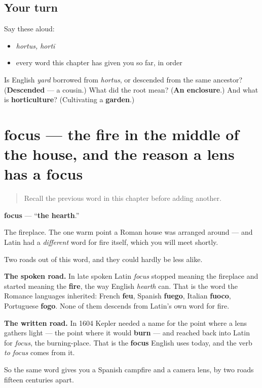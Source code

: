 \subsection*{Your turn}
Say these aloud:

\begin{itemize}
\raggedright
  \item \emph{hortus, hortī}
  \item every word this chapter has given you so far, in order
\end{itemize}

\begin{tcolorbox}[breakable,colback=teal!4,colframe=teal!35!black,title={Before you move on}]
Is English \emph{yard} borrowed from \emph{hortus}, or descended from the same ancestor? (\textbf{Descended} — a cousin.) What did the root mean? (\textbf{An enclosure}.) And what is \textbf{horticulture}? (Cultivating a \textbf{garden}.)
\end{tcolorbox}
\section[focus, focī]{focus — the fire in the middle of the house, and the reason a lens has a focus}

\label{lesson:LA-C44-focus}



\begin{quote}
Recall the previous word in this chapter before adding another.
\end{quote}

\begin{cousinweb}
\textbf{focus} — \textquotedblleft{}\textbf{the hearth}.\textquotedblright{}

The fireplace. The one warm point a Roman house was arranged around — and Latin had a \emph{different} word for fire itself, which you will meet shortly.

Two roads out of this word, and they could hardly be less alike.

\textbf{The spoken road.} In late spoken Latin \emph{focus} stopped meaning the fireplace and started meaning the \textbf{fire}, the way English \emph{hearth} can. That is the word the Romance languages inherited: French \textbf{feu}, Spanish \textbf{fuego}, Italian \textbf{fuoco}, Portuguese \textbf{fogo}. None of them descends from Latin's own word for fire.

\textbf{The written road.} In 1604 Kepler needed a name for the point where a lens gathers light — the point where it would \textbf{burn} — and reached back into Latin for \emph{focus}, the burning-place. That is the \textbf{focus} English uses today, and the verb \emph{to focus} comes from it.

So the same word gives you a Spanish campfire and a camera lens, by two roads fifteen centuries apart.
\end{cousinweb}

